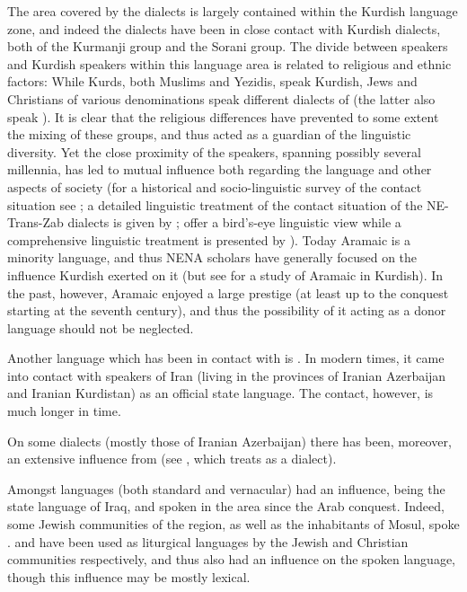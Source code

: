 The area covered by the  dialects is largely contained within the Kurdish language zone, and indeed the  dialects have been in close contact with Kurdish dialects, both of the Kurmanji group and the Sorani group. The divide between  speakers and Kurdish speakers within this language area is related to religious and ethnic factors: While Kurds, both Muslims and Yezidis, speak Kurdish, Jews and Christians of various denominations  speak different dialects of  (the latter also speak ). It is clear that the religious differences have prevented to some extent the mixing of these groups, and thus acted as a guardian of the linguistic diversity. Yet the close proximity of the speakers, spanning possibly several millennia, has led to mutual influence both regarding the language and other aspects of society (for a historical and socio-linguistic survey of the contact situation see \cite{ChyetInfluence}; a detailed linguistic treatment of the contact situation of the NE-Trans-Zab dialects is given by \cite{Garbell1965impact}; \cite{PennacchiettiContact} offer a bird's-eye linguistic view while  a comprehensive linguistic treatment is presented by \cite{CoghillChange}). Today Aramaic is a minority language, and thus NENA scholars have generally focused on the influence Kurdish exerted on it (but see \cite{ChyetLoanwords} for a study of Aramaic  in Kurdish). In the past, however, Aramaic enjoyed a large prestige (at least up to the  conquest starting at the seventh century), and thus the possibility of it acting as a donor language should not be neglected. 

		
Another  language which has been in contact with  is . In modern times, it came into contact with  speakers of Iran (living in the provinces of Iranian Azerbaijan and Iranian Kurdistan) as an official state language. The contact, however, is much longer in time. 
		
On some dialects (mostly those of Iranian Azerbaijan) there has been, moreover, an extensive influence from  (see \cite{Garbell1965impact}, which treats  as a  dialect).
		
Amongst  languages  (both standard and vernacular) had an influence, being the state language of Iraq, and spoken in the area since the Arab conquest.  Indeed, some Jewish communities of the region, as well as the inhabitants of Mosul, spoke  \citep[see map of][4]{JastrowAqra}.  and   have been used as liturgical languages by the Jewish and Christian communities respectively, and thus also had an influence on the spoken language, though this influence may be mostly lexical.
	

